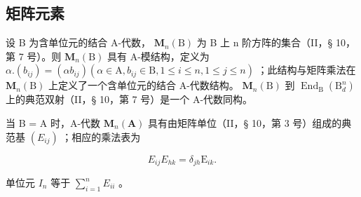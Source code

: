 \subsection{矩阵元素}

设 B 为含单位元的结合 A-代数， \(\mathbf{M}_{n}(\mathrm{B})\) 为 B 上 n 阶方阵的集合（II，§ 10，第 7 号）。则 \(\mathbf{M}_{n}(\mathrm{B})\) 具有 A-模结构，定义为 \(\alpha.(b_{ij})=(\alpha b_{ij})(\alpha\in\mathrm{A},b_{ij}\in\mathrm{B},1\leqslant i\leqslant n,1\leqslant j\leqslant n)\) ；此结构与矩阵乘法在 \(\mathbf{M}_{n}(\mathrm{B})\) 上定义了一个含单位元的结合 A-代数结构。 \(\mathbf{M}_{n}(\mathrm{B})\) 到 \(\operatorname{End}_{\mathrm{B}}(\mathrm{B}_{d}^{n})\) 上的典范双射（II，§ 10，第 7 号）是一个 A-代数同构。

当 B = A 时，A-代数 \(\mathbf{M}_{n}(\mathbf{A})\) 具有由矩阵单位（II，§ 10，第 3 号）组成的典范基 \((E_{ij})\) ；相应的乘法表为

\[
E _ {i j} E _ {h k} = \delta_ {j h} \mathrm{E} _ {i k}.\tag{1}
\]

单位元 \(I_{n}\) 等于 \(\sum_{i=1}^{n} E_{ii}\) 。

